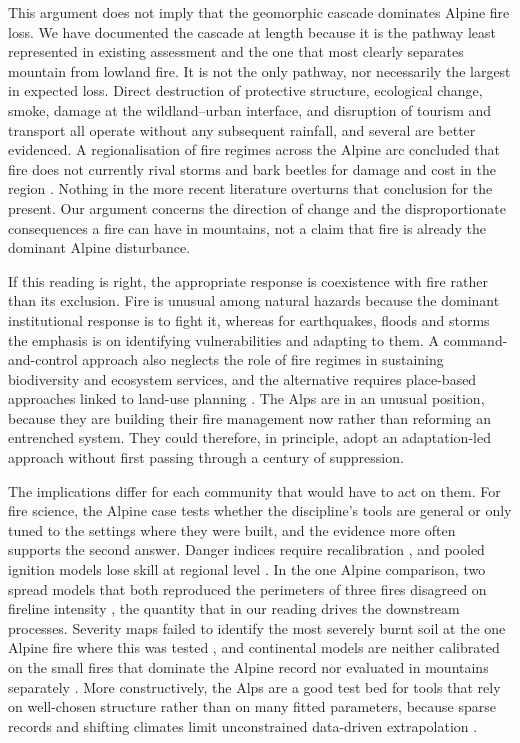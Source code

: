 \documentclass[11pt,a4paper]{article}
\begin{document}
This argument does not imply that the geomorphic cascade dominates Alpine fire loss. We have documented the cascade at length because it is the pathway least represented in existing assessment and the one that most clearly separates mountain from lowland fire. It is not the only pathway, nor necessarily the largest in expected loss. Direct destruction of protective structure, ecological change, smoke, damage at the wildland--urban interface, and disruption of tourism and transport all operate without any subsequent rainfall, and several are better evidenced. A regionalisation of fire regimes across the Alpine arc concluded that fire does not currently rival storms and bark beetles for damage and cost in the region \citep{conedera_characterizing_2018}. Nothing in the more recent literature overturns that conclusion for the present. Our argument concerns the direction of change and the disproportionate consequences a fire can have in mountains, not a claim that fire is already the dominant Alpine disturbance.

If this reading is right, the appropriate response is coexistence with fire rather than its exclusion. Fire is unusual among natural hazards because the dominant institutional response is to fight it, whereas for earthquakes, floods and storms the emphasis is on identifying vulnerabilities and adapting to them. A command-and-control approach also neglects the role of fire regimes in sustaining biodiversity and ecosystem services, and the alternative requires place-based approaches linked to land-use planning \citep{moritz_learning_2014}. The Alps are in an unusual position, because they are building their fire management now rather than reforming an entrenched system. They could therefore, in principle, adopt an adaptation-led approach without first passing through a century of suppression.

The implications differ for each community that would have to act on them. For fire science, the Alpine case tests whether the discipline's tools are general or only tuned to the settings where they were built, and the evidence more often supports the second answer. Danger indices require recalibration \citep{de_angelis_modelling_2015, zacharakis_environmental_2023}, and pooled ignition models lose skill at regional level \citep{gelabert_assessing_2025}. In the one Alpine comparison, two spread models that both reproduced the perimeters of three fires disagreed on fireline intensity \citep{malanchini_modeling_2025}, the quantity that in our reading drives the downstream processes. Severity maps failed to identify the most severely burnt soil at the one Alpine fire where this was tested \citep{negri_wildfire_2026}, and continental models are neither calibrated on the small fires that dominate the Alpine record nor evaluated in mountains separately \citep{forrest_understanding_2024}. More constructively, the Alps are a good test bed for tools that rely on well-chosen structure rather than on many fitted parameters, because sparse records and shifting climates limit unconstrained data-driven extrapolation \citep{jain_review_2020}.
\end{document}
